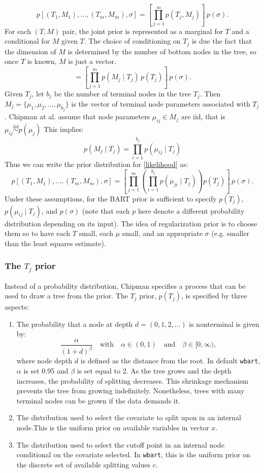 \documentclass[a4paper,11pt]{article}
\begin{document}
\[
p[(T_1, M_1), \ldots, (T_m, M_m), \sigma] = \left[ \prod_{j=1}^m p(T_j, M_j) \right] \, p(\sigma).
\]
For each  $(T, M)$ pair, the joint prior is represented as a marginal for $T$ and a conditional for $M$ given $T$. The choice of conditioning on $T_j$ is due the fact that the dimension of $M$ is determined by the number of bottom nodes in the tree, so once $T$ is known, $M$ is just a vector. 
\[
= \left[ \prod_{j=1}^m p(M_j \mid T_j) \, p(T_j) \right] \, p(\sigma).
\]
Given $T_j$, let  \( b_j \)  be the number of terminal nodes in the tree \( T_j \). Then \( M_j = \{\mu_1, \mu_2, \ldots, \mu_{b_j}\} \) is the vector of terminal node parameters associated with \( T_j \).  Chipman at al. assume that node parameters \( \mu_{ij} \in M_j\) are iid, that is $\mu_{ij} \overset{\mathrm{iid}}{\sim} p(\mu_j)$ This implies: 
\[
p(M_j \mid T_j) = \prod_{i=1}^{b_j} p(\mu_{ij} \mid T_j)
\]
Thus we can write the prior distribution for \eqref{likelihood} as:
\[
p[(T_1, M_1), \ldots, (T_m, M_m), \sigma]= \left[ \prod_{j=1}^m \left( \prod_{i=1}^{b_j} p(\mu_{ji} \mid T_j) \right) p(T_j) \right] \, p(\sigma).
\]
Under these assumptions, for the BART prior is sufficient to specify \( p(T_j) \), \( p(\mu_{ij} \mid T_j) \), and \( p(\sigma) \) (note that each $p$ here denote a different probability distribution depending on its input). The idea of regularization prior is to choose them so to have each $T$ small, each $\mu$ small,  and an appropriate $\sigma$  (e.g. smaller than the least squares estimate). 

\subsubsection{The $T_j$ prior}
 Instead of a probability distribution, Chipman specifies a process that can be used to draw a tree from the prior. The \( T_j \) prior, \( p(T_j) \), is specified by three aspects:
\begin{enumerate}
    \item The probability that a node at depth \( d = (0, 1, 2, \ldots) \) is nonterminal is given by:
    \[
    \frac{\alpha}{(1 + d)^\beta}  \quad \text{with} \quad \alpha \in (0, 1) \quad \text{and} \quad \beta \in [0, \infty),
    \]
    where node depth $d$ is defined as the distance from the root. In default \texttt{wbart}, $\alpha$ is set 0.95 and $\beta$ is set equal to 2. As the tree grows and the depth increases, the probability of splitting decreases. This shrinkage mechanism prevents the tree from growing indefinitely. Nonetheless, trees with many terminal nodes can be grown if the data demands it.
    \item The distribution used to select the covariate to split upon in an internal node.This is the uniform prior on available variables in vector $x$.
    \item The distribution used to select the cutoff point in an internal node conditional on the covariate selected. In \texttt{wbart}, this is the uniform prior on the discrete set of available splitting values $c$.
\end{enumerate}
\end{document}
